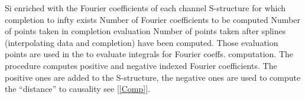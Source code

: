 %
%
%
%
%
%
%
%
{\fitem[So] Si enriched with the Fourier coefficients of each channel}
{\fitem[Si] S-structure for which completion to infty exists}
{ Number of Fourier coefficients to be computed
 Number of points taken in completion evaluation
 Number of points taken after splines
(interpolating data and completion) have been
computed. Those evaluation points are used in the to evaluate integrals for Fourier
coeffs. computation.
}
{The procedure computes positive and negative indexed Fourier
  coefficients. The positive ones are added to the S-structure, the
  negative ones are used to compute the ``distance'' to causality
  see [\ref{Comp}].
}
